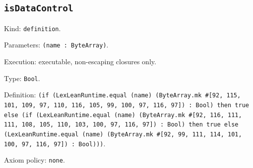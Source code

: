 \documentclass[11pt]{article}
\begin{document}
\subsection*{\texttt{isDataControl}}
\noindent Kind: \texttt{definition}.\par
\noindent Parameters: \texttt{(name : ByteArray)}.\par
\noindent Execution: executable, non-escaping closures only.\par
\noindent Type: \texttt{Bool}.\par
\noindent Definition: \texttt{(if (LexLeanRuntime.equal (name) (ByteArray.mk \#[92, 115, 101, 109, 97, 110, 116, 105, 99, 100, 97, 116, 97]) : Bool) then true else (if (LexLeanRuntime.equal (name) (ByteArray.mk \#[92, 116, 111, 111, 108, 105, 110, 103, 100, 97, 116, 97]) : Bool) then true else (LexLeanRuntime.equal (name) (ByteArray.mk \#[92, 99, 111, 114, 101, 100, 97, 116, 97]) : Bool)))}.\par
\noindent Axiom policy: \texttt{none}.\par
\end{document}
